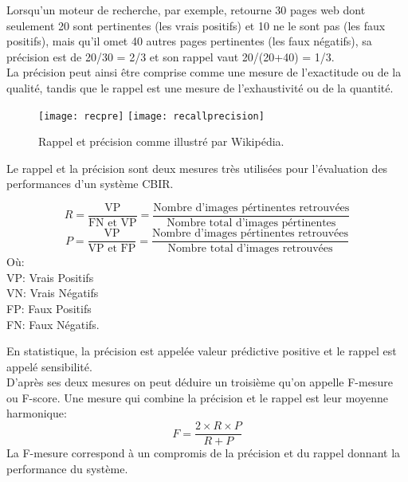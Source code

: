 Lorsqu'un moteur de recherche, par exemple, retourne 30 pages web dont seulement 20 sont pertinentes (les vrais positifs) et 10 ne le sont pas (les faux positifs), mais qu'il omet 40 autres pages pertinentes (les faux négatifs), sa précision est de 20/30 = 2/3 et son rappel vaut 20/(20+40) = 1/3.\\

La précision peut ainsi être comprise comme une mesure de l'exactitude ou de la qualité, tandis que le rappel est une mesure de l'exhaustivité ou de la quantité.\\


\begin{figure}[H]
	\texttt{[image: recpre]} 
	\texttt{[image: recallprecision]} 
	\caption{Rappel et précision comme illustré par Wikipédia.}
\end{figure}
Le rappel et la précision sont deux mesures très utilisées pour l’évaluation des performances d’un système CBIR. 

\begin{equation}
R = \frac{\text{VP}}{\text{FN et VP}} = \frac{\text{Nombre d'images pértinentes retrouvées} }{\text{Nombre total d'images pértinentes}}
\end{equation}
\begin{equation}
P = \frac{\text{VP}}{\text{VP et FP}} = \frac{\text{Nombre d'images pértinentes retrouvées}}{\text{Nombre total d'images retrouvées}}
\end{equation}
Où: \\
VP: Vrais Positifs\\
VN: Vrais Négatifs\\
FP: Faux Positifs\\
FN: Faux Négatifs.
 
En statistique, la précision est appelée valeur prédictive positive et  le rappel est appelé sensibilité.\\

D'après ses deux mesures on peut déduire un troisième qu'on appelle F-mesure ou F-score. Une mesure qui combine la précision et le rappel est leur moyenne harmonique:
\begin{equation}
F = \frac{2\times R\times P}{R + P} 
\end{equation}
La F-mesure correspond à un compromis de la précision et du rappel donnant la performance du système.\\

